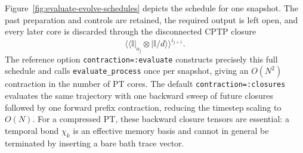 Figure~\ref{fig:evaluate-evolve-schedules} depicts the schedule for one snapshot.
The past preparation and controls are retained, the required output is left open, and every later core is discarded through the disconnected CPTP closure
%
\begin{equation}
    \langle\!\langle\mathbb I\rvert_{o_j} \otimes \lvert\mathbb I/d\rangle\!\rangle^{i_{j+1}}.
    \label{eq:evolve-future-closure}
\end{equation}
%
The reference option \texttt{contraction=:evaluate} constructs precisely this full schedule and calls \texttt{evaluate\_process} once per snapshot, giving an \(O(N^2)\) contraction in the number of PT cores.
The default \texttt{contraction=:closures} evaluates the same trajectory with one backward sweep of future closures followed by one forward prefix contraction, reducing the timestep scaling to \(O(N)\).
For a compressed PT, these backward closure tensors are essential: a temporal bond \(\chi_k\) is an effective memory basis and cannot in general be terminated by inserting a bare bath trace vector.
